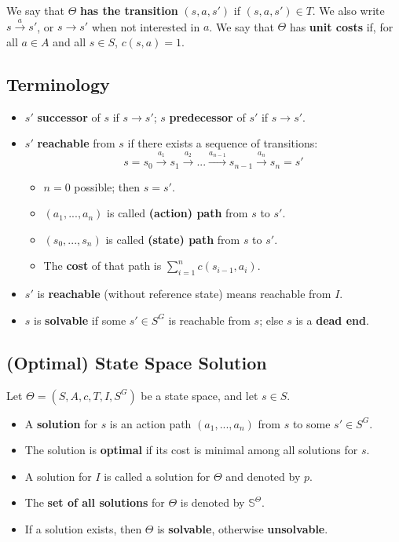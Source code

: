 \documentclass[conference, a4paper]{styles/acmsiggraph}
\begin{document}
        We say that $\Theta$ \textbf{has the transition} $(s,a,s')$ if $(s,a,s') \in T$.
        We also write $s \xrightarrow{a} s'$, or $s \rightarrow s'$ when not interested in $a$.
        We say that $\Theta$ has \textbf{unit costs} if, for all $a \in A$ and all $s \in S$, $c(s,a)=1$.
        

    \subsection{Terminology}
        \begin{itemize}
            \item $s'$ \textbf{successor} of $s$ if $s \rightarrow s'$; $s$ \textbf{predecessor} of $s'$ if $s \rightarrow s'$.
            \item $s'$ \textbf{reachable} from $s$ if there exists a sequence of transitions:
                $$s = s_0 \xrightarrow{a_1} s_1 \xrightarrow{a_2} ... \xrightarrow{a_{n-1}} s_{n-1} \xrightarrow{a_n} s_n = s'$$
                \begin{itemize}
                    \item $n=0$ possible; then $s=s'$.
                    \item $(a_1,...,a_n)$ is called \textbf{(action) path} from $s$ to $s'$.
                    \item $(s_0,...,s_n)$ is called \textbf{(state) path} from $s$ to $s'$.
                    \item The \textbf{cost} of that path is $\sum\limits_{i=1}^n c(s_{i-1},a_i)$.
                \end{itemize}
            \item $s'$ is \textbf{reachable} (without reference state) means reachable from $I$.
            \item $s$ is \textbf{solvable} if some $s' \in S^G$ is reachable from $s$; else $s$ is a \textbf{dead end}.
        \end{itemize}
    
    
    \subsection{(Optimal) State Space Solution}
        Let $\Theta = (S,A,c,T,I,S^G)$ be a state space, and let $s\in S$.
        \begin{itemize}
            \item A \textbf{solution} for $s$ is an action path $(a_1,...,a_n)$ from $s$ to some $s' \in S^G$.
            \item The solution is \textbf{optimal} if its cost is minimal among all solutions for $s$.
            \item A solution for $I$ is called a solution for $\Theta$ and denoted by $p$.
            \item The \textbf{set of all solutions} for $\Theta$ is denoted by $\mathbb{S}^{\Theta}$.
            \item If a solution exists, then $\Theta$ is \textbf{solvable}, otherwise \textbf{unsolvable}.
        \end{itemize}
    
\end{document}
